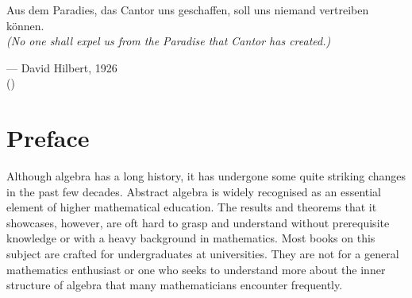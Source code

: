 

\newcommand{\version}{0.3}
\newcommand{\volumetitle}{Volume 0: Prerequisites}

\linespread{1.05}

\renewcommand{\thetheorem}{\arabic{part}.\arabic{chapter}.\arabic{section}.\arabic{theorem}}
\renewcommand{\theexercisehidden}{\arabic{part}.\arabic{chapter}.\arabic{exercisehidden}}
\renewcommand{\theproblem}{\arabic{part}.\arabic{chapter}.\arabic{problem}}


\frontmatter  %
\coverpages

\thispagestyle{empty}
\vspace*{2cm}

\begin{center}
    \Large{\parbox{10cm}{
        \begin{raggedright}
        {
            \large
            Aus dem Paradies, das Cantor uns geschaffen, soll uns niemand vertreiben k\"{o}nnen.\\
            \textit{(No one shall expel us from the Paradise that Cantor has created.)}
        }

            \vspace{.5cm}
            \hfill{--- David Hilbert, 1926}\\
            \vspace{-.25cm}
            \normalsize
            \hfill{(\cite[p.~170]{hilbert_1926})}
        \end{raggedright}
    }
}
\end{center}

\newpage

\tableofcontents
\setcounter{part}{0}

\chapter{Preface}
Although algebra has a long history, it has undergone some quite striking changes in the past few decades. Abstract algebra is widely recognised as an essential element of higher mathematical education. The results and theorems that it showcases, however, are oft hard to grasp and understand without prerequisite knowledge or with a heavy background in mathematics. Most books on this subject are crafted for undergraduates at universities. They are not for a general mathematics enthusiast or one who seeks to understand more about the inner structure of algebra that many mathematicians encounter frequently.

